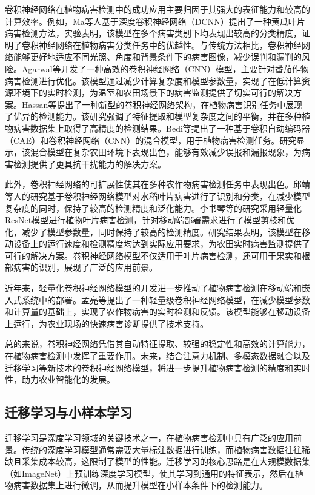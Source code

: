 卷积神经网络在植物病害检测中的成功应用主要归因于其强大的表征能力和较高的计算效率。例如，Ma等人基于深度卷积神经网络（DCNN）提出了一种黄瓜叶片病害检测方法，实验表明，该模型在多个病害类别下均表现出较高的分类精度，证明了卷积神经网络在植物病害分类任务中的优越性\cite{7}。与传统方法相比，卷积神经网络能够更好地适应不同光照、角度和背景条件下的病害图像，减少误判和漏判的风险。Agarwal等\cite{12}开发了一种高效的卷积神经网络（CNN）模型，主要针对番茄作物病害检测进行优化。该模型通过减少计算复杂度和模型参数量，实现了在低计算资源环境下的实时检测，为温室和农田场景下的病害监测提供了切实可行的解决方案。Hassan等\cite{13}提出了一种新型的卷积神经网络架构，在植物病害识别任务中展现了优异的检测能力。该研究强调了特征提取和模型复杂度之间的平衡，并在多种植物病害数据集上取得了高精度的检测结果。Bedi等\cite{25}提出了一种基于卷积自动编码器（CAE）和卷积神经网络（CNN）的混合模型，用于植物病害检测任务。研究显示，该混合模型在复杂农田环境下表现出色，能够有效减少误报和漏报现象，为病害检测提供了更具抗干扰能力的解决方案。

此外，卷积神经网络的可扩展性使其在多种农作物病害检测任务中表现出色。邱靖等人的研究基于卷积神经网络模型对水稻叶片病害进行了识别和分类，在减少模型复杂度的同时，保持了较高的检测精度和泛化能力\cite{3}。李书琴等的研究采用轻量化ResNet模型进行植物叶片病害检测，针对移动端部署需求进行了模型剪枝和优化，减少了模型参数量，同时保持了较高的检测精度\cite{5}。研究结果表明，该模型在移动设备上的运行速度和检测精度均达到实际应用要求，为农田实时病害监测提供了可行的解决方案。卷积神经网络模型不仅适用于叶片病害检测，还可用于果实和根部病害的识别，展现了广泛的应用前景。

近年来，轻量化卷积神经网络模型的开发进一步推动了植物病害检测在移动端和嵌入式系统中的部署。孟亮等提出了一种轻量级卷积神经网络模型，在减少模型参数和计算量的基础上，实现了农作物病害的实时检测和反馈\cite{4}。该模型能够在移动设备上运行，为农业现场的快速病害诊断提供了技术支持。

总的来说，卷积神经网络凭借其自动特征提取、较强的稳定性和高效的计算能力，在植物病害检测中发挥了重要作用。未来，结合注意力机制、多模态数据融合以及迁移学习等新技术的卷积神经网络模型，将进一步提升植物病害检测的精度和实时性，助力农业智能化的发展。

\subsection{迁移学习与小样本学习}
迁移学习是深度学习领域的关键技术之一，在植物病害检测中具有广泛的应用前景。传统的深度学习模型通常需要大量标注数据进行训练，而植物病害数据往往稀缺且采集成本较高，这限制了模型的性能。迁移学习的核心思路是在大规模数据集（如ImageNet）上预训练深度学习模型，使其学习到通用的特征表示，然后在植物病害数据集上进行微调，从而提升模型在小样本条件下的检测能力。

